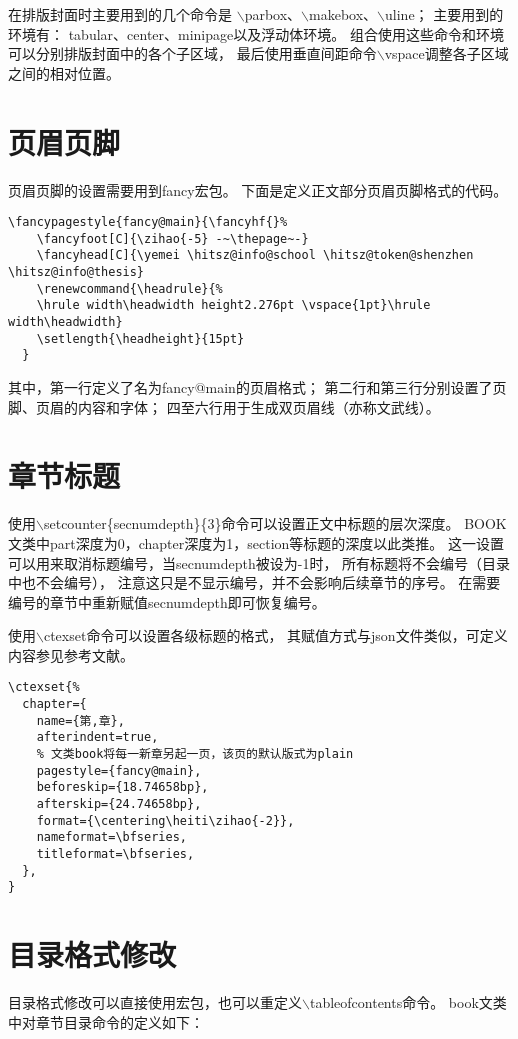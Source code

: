 在排版封面时主要用到的几个命令是
$\backslash$parbox、$\backslash$makebox、$\backslash$uline；
主要用到的环境有：
tabular、center、minipage以及浮动体环境。
组合使用这些命令和环境可以分别排版封面中的各个子区域，
最后使用垂直间距命令$\backslash$vspace调整各子区域之间的相对位置。


\section{页眉页脚}
页眉页脚的设置需要用到fancy宏包。
下面是定义正文部分页眉页脚格式的代码。
\begin{lstlisting}[style=latex]
  \fancypagestyle{fancy@main}{\fancyhf{}%
    \fancyfoot[C]{\zihao{-5} -~\thepage~-}
    \fancyhead[C]{\yemei \hitsz@info@school \hitsz@token@shenzhen \hitsz@info@thesis}
    \renewcommand{\headrule}{%
    \hrule width\headwidth height2.276pt \vspace{1pt}\hrule width\headwidth}
    \setlength{\headheight}{15pt}
  }
\end{lstlisting}
其中，第一行定义了名为fancy@main的页眉格式；
第二行和第三行分别设置了页脚、页眉的内容和字体；
四至六行用于生成双页眉线（亦称文武线）。


\section{章节标题}
使用$\backslash$setcounter\{secnumdepth\}\{3\}命令可以设置正文中标题的层次深度。
BOOK文类中part深度为0，chapter深度为1，section等标题的深度以此类推。
这一设置可以用来取消标题编号，当secnumdepth被设为-1时，
所有标题将不会编号（目录中也不会编号），
注意这只是不显示编号，并不会影响后续章节的序号。
在需要编号的章节中重新赋值secnumdepth即可恢复编号。

使用$\backslash$ctexset命令可以设置各级标题的格式，
其赋值方式与json文件类似，可定义内容参见参考文献\cite[193]{man}。

\begin{lstlisting}[style=latex]
\ctexset{%
  chapter={
    name={第,章},
    afterindent=true,
    % 文类book将每一新章另起一页，该页的默认版式为plain
    pagestyle={fancy@main},
    beforeskip={18.74658bp},
    afterskip={24.74658bp},
    format={\centering\heiti\zihao{-2}},
    nameformat=\bfseries,
    titleformat=\bfseries,
  },
}
\end{lstlisting}


\section{目录格式修改}
目录格式修改可以直接使用宏包，也可以重定义$\backslash$tableofcontents命令。
book文类中对章节目录命令的定义如下：


